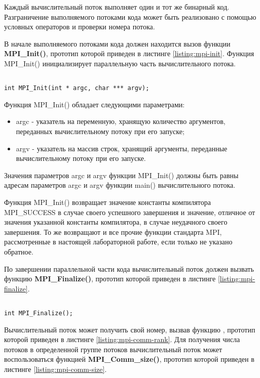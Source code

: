 Каждый вычислительный поток выполняет один и тот же бинарный код. Разграничение выполняемого потоками кода может быть реализовано с помощью условных операторов и проверки номера потока.

В начале выполняемого потоками кода должен находится вызов функции {\bf MPI\_Init()}, прототип которой приведен в листинге \ref{listing:mpi-init}. Функция MPI\_Init() инициализирует параллельную часть вычислительного потока.

\begin{lstlisting}

int MPI_Init(int * argc, char *** argv);

\end{lstlisting}
\mylistingend

Функция MPI\_Init() обладает следующими параметрами:

\begin{itemize}

	\item argc - указатель на переменную, хранящую количество аргументов, переданных вычислительному потоку при его запуске;
	\item argv - указатель на массив строк, хранящий аргументы, переданные вычислительному потоку при его запуске.

\end{itemize}

Значения параметров argc и argv функции MPI\_Init() должны быть равны адресам параметров argc и argv функции main() вычислительного потока.

Функция MPI\_Init() возвращает значение константы компилятора MPI\_SUCCESS в случае своего успешного завершения и значение, отличное от значения указанной константы компилятора, в случае неудачного своего завершения. То же возвращают и все прочие функции стандарта MPI, рассмотренные в настоящей лабораторной работе, если только не указано обратное.

По завершении параллельной части кода вычислительный поток должен вызвать функцию {\bf MPI\_Finalize()}, прототип которой приведен в листинге \ref{listing:mpi-finalize}.

\begin{lstlisting}

int MPI_Finalize();

\end{lstlisting}
\mylistingend

Вычислительный поток может получить свой номер, вызвав функцию , прототип которой приведен в листинге \ref{listing:mpi-comm-rank}. Для получения числа потоков в определенной группе потоков вычислительный поток может воспользоваться функцией {\bf MPI\_Comm\_size()}, прототип которой приведен в листинге \ref{listing:mpi-comm-size}.

